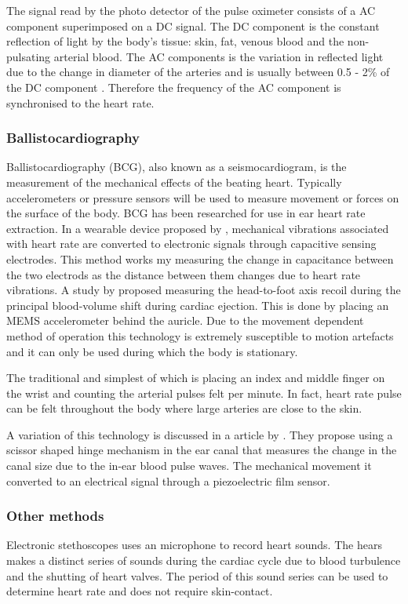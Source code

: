 The signal read by the photo detector of the pulse oximeter consists of a AC component superimposed on a DC signal. The DC component is the constant reflection of light by the body's tissue: skin, fat, venous blood and the non-pulsating arterial blood. The AC components is the variation in reflected light due to the change in diameter of the arteries and is usually between 0.5 - 2\% of the DC component  \citep{tavakoli2006analog}. Therefore the frequency of the AC component is synchronised to the heart rate.

\subsubsection{Ballistocardiography}
Ballistocardiography (BCG), also known as a seismocardiogram, is the measurement of the mechanical effects of the beating heart. Typically accelerometers or pressure sensors will be used to measure movement or forces on the surface of the body. BCG has been researched for use in ear heart rate extraction. In a wearable device proposed by \cite{da2010ear}, mechanical vibrations associated with heart rate are converted to electronic signals through capacitive sensing electrodes. This method works my measuring the change in capacitance between the two electrods as the distance between them changes due to heart rate vibrations. A study by \cite{winokur2012wearable} proposed measuring the head-to-foot axis recoil during the principal blood-volume shift during cardiac ejection. This is done by placing an MEMS accelerometer behind the auricle. Due to the movement dependent method of operation this technology is extremely susceptible to motion artefacts and it can only be used during which the body is stationary.


The traditional and simplest of which is placing an index and middle finger on the wrist and counting the arterial pulses felt per minute. In fact, heart rate pulse can be felt throughout the body where large arteries are close to the skin.

A variation of this technology is discussed in a article by \cite{park2015wearable}. They propose using a scissor shaped hinge mechanism in the ear canal that measures the change in the canal size due to the in-ear blood pulse waves. The mechanical movement it converted to an electrical signal through a piezoelectric film sensor.

\subsubsection{Other methods}
Electronic stethoscopes uses an microphone to record heart sounds. The hears makes a distinct series of sounds during the cardiac cycle due to blood turbulence and the shutting of heart valves. The period of this sound series can be used to determine heart rate and does not require skin-contact.


